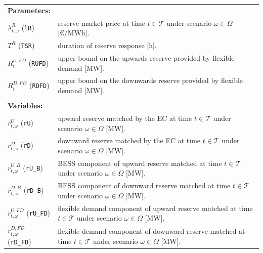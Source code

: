 \begin{tabularx}{\textwidth}{l X}

\textbf{Parameters:} \\
$\lambda^R_{t, \omega}$ (\texttt{lR}) & reserve market price at time $t \in \mathcal{T}$ under scenario $\omega \in \Omega$ [\euro/MWh]. \\
$T^R$ (\texttt{TSR}) & duration of reserve response [h]. \\
$R^{U, FD}_t$ (\texttt{RUFD}) & upper bound on the upwards reserve provided by flexible demand [MW]. \\
$R^{D, FD}_t$ (\texttt{RDFD}) & upper bound on the downwards reserve provided by flexible demand [MW]. \\
\\

\textbf{Variables:} \\
$r^U_{t, \omega}$ (\texttt{rU}) & upward reserve matched by the EC at time $t \in \mathcal{T}$ under scenario $\omega \in \Omega$ [MW]. \\
$r^D_{t, \omega}$ (\texttt{rD}) & downward reserve matched by the EC at time $t \in \mathcal{T}$ under scenario $\omega \in \Omega$ [MW]. \\
$r^{U, B}_{t, \omega}$ (\texttt{rU\_B}) & BESS component of upward reserve matched at time $t \in \mathcal{T}$ under scenario $\omega \in \Omega$ [MW]. \\
$r^{D, B}_{t, \omega}$ (\texttt{rD\_B}) & BESS component of downward reserve matched at time $t \in \mathcal{T}$ under scenario $\omega \in \Omega$ [MW]. \\
$r^{U, FD}_{t, \omega}$ (\texttt{rU\_FD}) & flexible demand component of upward reserve matched at time $t \in \mathcal{T}$ under scenario $\omega \in \Omega$ [MW]. \\
$r^{D, FD}_{t, \omega}$ (\texttt{rD\_FD}) & flexible demand component of downward reserve matched at time $t \in \mathcal{T}$ under scenario $\omega \in \Omega$ [MW]. \\
\end{tabularx}

